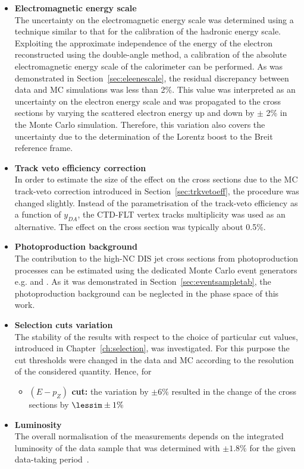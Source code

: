 \begin{itemize}
	\item \textbf{Electromagnetic energy scale}\\
		The uncertainty on the electromagnetic energy scale was determined using a technique similar to that for the calibration of the hadronic energy scale. Exploiting the approximate independence of the energy of the electron reconstructed using the double-angle method, a calibration of the absolute electromagnetic energy scale of the calorimeter can be performed. As was demonstrated in Section~\ref{sec:eleenescale}, the residual discrepancy between data and MC simulations was less than 2\%. This value was interpreted as an uncertainty on the electron energy scale and was propagated to the cross sections by varying the scattered electron energy up and down by $\pm$ 2\% in the Monte Carlo simulation. Therefore, this variation also covers the uncertainty due to the determination of the Lorentz boost to the Breit reference frame. 
	
	\item \textbf{Track veto efficiency correction}\\
		In order to estimate the size of the effect on the cross sections due to the MC track-veto correction introduced in Section~\ref{sec:trkvetoeff}, the procedure was changed slightly. Instead of the parametrisation of the track-veto efficiency as a function of $y_{DA}$, the CTD-FLT vertex tracks multiplicity was used as an alternative. The effect on the cross section was typically about 0.5\%.
	
	\item \textbf{Photoproduction background}\\
		The contribution to the high-\qsq NC DIS jet cross sections from photoproduction processes can be estimated using the dedicated Monte Carlo event generators e.g. \pythia and \herwig. As it was demonstrated in Section~\ref{sec:eventsampletab}, the photoproduction background can be neglected in the phase space of this work.
	
	\item \textbf{Selection cuts variation} \\
		The stability of the results with respect to the choice of particular cut values, introduced in Chapter~\ref{ch:selection}, was investigated. For this purpose the cut thresholds were changed in the data and MC according to the resolution of the considered quantity. Hence, for 
		\begin{itemize}
			\item \textbf{$\left( E-p_Z\right) $ cut:} the variation by $\pm6\%$ resulted in the change of the cross sections by $\lessim \pm 1\%$
		\end{itemize}
	\item \textbf{Luminosity} \\
		The overall normalisation of the measurements depends on the integrated luminosity of the data sample that was determined with $\pm1.8\%$ for the given data-taking period~\cite{}.
\end{itemize}
